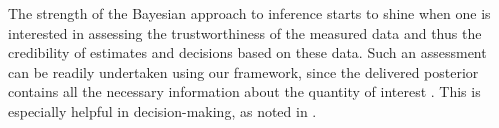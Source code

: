 The strength of the Bayesian approach to inference starts to shine when one is
interested in assessing the trustworthiness of the measured data and thus the
credibility of estimates and decisions based on these data. Such an assessment
can be readily undertaken using our framework, since the delivered posterior
contains all the necessary information about the quantity of interest \g. This
is especially helpful in decision-making, as noted in .
